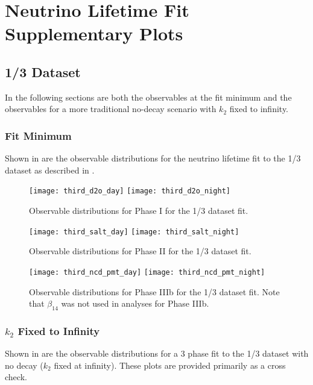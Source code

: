 \chapter{Neutrino Lifetime Fit Supplementary Plots}

\section{1/3 Dataset}
\label{third_observables}

In the following sections are both the observables at the fit minimum and the observables for a more traditional no-decay scenario with $k_2$ fixed to infinity. 

\subsection{Fit Minimum}

Shown in  are the observable distributions for the neutrino lifetime fit to the 1/3 dataset as described in .

\begin{figure}
\centering
\texttt{[image: third\_d2o\_day]}
\texttt{[image: third\_d2o\_night]}
\caption{\label{fig:third_d2o_obs}Observable distributions for Phase I for the 1/3 dataset fit.}
\end{figure}
\begin{figure}
\centering
\texttt{[image: third\_salt\_day]}
\texttt{[image: third\_salt\_night]}
\caption{\label{fig:third_salt_obs}Observable distributions for Phase II for the 1/3 dataset fit.}
\end{figure}
\begin{figure}
\centering
\texttt{[image: third\_ncd\_pmt\_day]}
\texttt{[image: third\_ncd\_pmt\_night]}
\caption{\label{fig:third_ncd_pmt_obs}Observable distributions for Phase IIIb for the 1/3 dataset fit. Note that $\beta_{14}$ was not used in analyses for Phase IIIb.}
\end{figure}

\clearpage

\subsection{\texorpdfstring{$k_2$}{k2} Fixed to Infinity}

Shown in  are the observable distributions for a 3 phase fit to the 1/3 dataset with no decay ($k_2$ fixed at infinity). These plots are provided primarily as a cross check.

